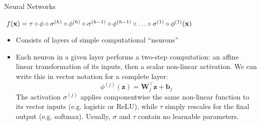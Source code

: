 \documentclass[11pt,compress,t,notes=noshow, xcolor=table]{beamer}
\begin{document}
\begin{vbframe}{Neural Networks}

$f(\mathbf{x}) = \tau \circ \phi \circ \sigma^{(h)} \circ \phi^{(h)} \circ \sigma^{(h-1)} \circ \phi^{(h-1)} \circ \ldots \circ \sigma^{(1)} \circ \phi^{(1)} (\mathbf{x})$

\begin{figure}
  \centering
\end{figure}

\begin{itemize}
  \item Consists of layers of simple computational \enquote{neurons} 
  \item Each neuron in a given layer performs a two-step computation: an affine linear transformation of its inputs, then a scalar non-linear activation. We can write this in vector notation for a complete layer:
  $$
    \phi^{(j)}(\bm{z}) = \bm{W}_j^\top \bm{z} + \bm{b}_j 
  $$
  The activation $\sigma^{(j)}$ applies componentwise the same non-linear function to its vector inputs (e.g. logistic or ReLU), while $\tau$ simply rescales for the final output (e.g. softmax). 
  Usually, $\sigma$ and $\tau$ contain no learnable parameters.
\end{itemize}

\end{vbframe}


\endlecture
\end{document}
